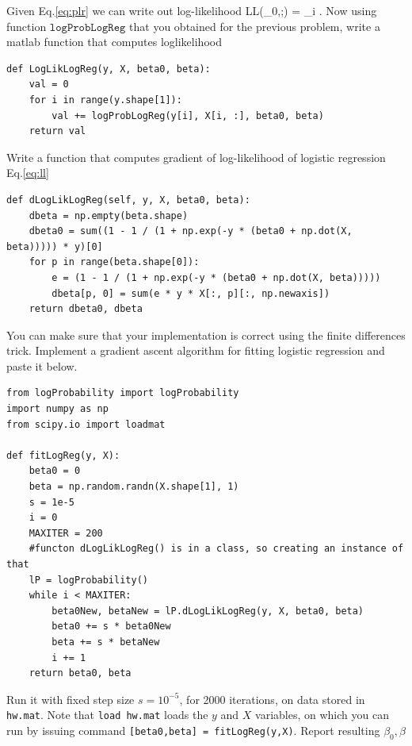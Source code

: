 \documentclass{article}
\begin{document}
\newproblem{1pt}
Given Eq.\eqref{eq:plr} we can write out log-likelihood
\BEQ \label{eq:ll}
\textrm{LL}(\beta_0,\beta;) = \sum_i \log {}.
\EEQ
Now using function $\texttt{logProbLogReg}$ that you obtained for the previous problem, write a matlab function that computes loglikelihood
\begin{lstlisting}
def LogLikLogReg(y, X, beta0, beta):
	val = 0
	for i in range(y.shape[1]):
		val += logProbLogReg(y[i], X[i, :], beta0, beta)
	return val
\end{lstlisting}
\newproblem{1pt}
Write a function that computes gradient of log-likelihood of logistic regression Eq.\eqref{eq:ll}
\begin{lstlisting}
def dLogLikLogReg(self, y, X, beta0, beta):
	dbeta = np.empty(beta.shape)
	dbeta0 = sum((1 - 1 / (1 + np.exp(-y * (beta0 + np.dot(X, beta))))) * y)[0]
	for p in range(beta.shape[0]):
		e = (1 - 1 / (1 + np.exp(-y * (beta0 + np.dot(X, beta))))) 
		dbeta[p, 0] = sum(e * y * X[:, p][:, np.newaxis])
	return dbeta0, dbeta
\end{lstlisting}
You can make sure that your implementation is correct using the finite differences trick.
\newproblem{1pt}
Implement a gradient ascent algorithm for fitting logistic regression and paste it below.
\begin{lstlisting}
from logProbability import logProbability
import numpy as np
from scipy.io import loadmat

def fitLogReg(y, X):
	beta0 = 0
	beta = np.random.randn(X.shape[1], 1)
	s = 1e-5
	i = 0
	MAXITER = 200
	#functon dLogLikLogReg() is in a class, so creating an instance of that
	lP = logProbability()
	while i < MAXITER:
		beta0New, betaNew = lP.dLogLikLogReg(y, X, beta0, beta)
		beta0 += s * beta0New
		beta += s * betaNew
		i += 1
	return beta0, beta
\end{lstlisting}
Run it with fixed step size $s=10^{-5}$, for 2000 iterations, on data stored in \texttt{hw\theHW.mat}.
Note that \texttt{load hw\theHW.mat} loads the $y$ and $X$ variables, on which you can run by issuing command
\texttt{[beta0,beta] = fitLogReg(y,X)}.
Report resulting $\beta_0,\beta$
\end{document}
